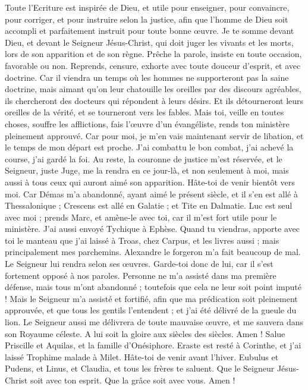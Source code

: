 \begin{multicols}{2}
Toute l'Ecriture est inspirée de Dieu, et utile pour enseigner, pour convaincre, pour corriger, et pour instruire selon la justice,
afin que l'homme de Dieu soit accompli et parfaitement instruit pour toute bonne œuvre.
\VerseOne{}Je te somme devant Dieu, et devant le Seigneur Jésus-Christ, qui doit juger les vivants et les morts, lors de son apparition et de son règne.
Prêche la parole, insiste en toute occasion, favorable ou non. Reprends, censure, exhorte avec toute douceur d'esprit, et avec doctrine.
Car il viendra un temps où les hommes ne supporteront pas la saine doctrine, mais aimant qu'on leur chatouille les oreilles par des discours agréables, ils chercheront des docteurs qui répondent à leurs désirs.
Et ils détourneront leurs oreilles de la vérité, et se tourneront vers les fables.
Mais toi, veille en toutes choses, souffre les afflictions, fais l'œuvre d'un évangéliste, rends ton ministère pleinement approuvé.
Car pour moi, je m'en vais maintenant servir de libation, et le temps de mon départ est proche.
J'ai combattu le bon combat, j'ai achevé la course, j'ai gardé la foi.
Au reste, la couronne de justice m'est réservée, et le Seigneur, juste Juge, me la rendra en ce jour-là, et non seulement à moi, mais aussi à tous ceux qui auront aimé son apparition.
Hâte-toi de venir bientôt vers moi.
Car Démas m'a abandonné, ayant aimé le présent siècle, et il s'en est allé à Thessalonique ; Crescens est allé en Galatie ; et Tite en Dalmatie.
Luc est seul avec moi ; prends Marc, et amène-le avec toi, car il m'est fort utile pour le ministère.
J'ai aussi envoyé Tychique à Ephèse.
Quand tu viendras, apporte avec toi le manteau que j'ai laissé à Troas, chez Carpus, et les livres aussi ; mais principalement mes parchemins.
Alexandre le forgeron m'a fait beaucoup de mal. Le Seigneur lui rendra selon ses œuvres.
Garde-toi donc de lui, car il s'est fortement opposé à nos paroles.
Personne ne m'a assisté dans ma première défense, mais tous m'ont abandonné ; toutefois que cela ne leur soit point imputé !
Mais le Seigneur m'a assisté et fortifié, afin que ma prédication soit pleinement approuvée, et que tous les gentils l’entendent ; et j'ai été délivré de la gueule du lion.
Le Seigneur aussi me délivrera de toute mauvaise œuvre, et me sauvera dans son Royaume céleste. A lui soit la gloire aux siècles des siècles. Amen !
Salue Priscille et Aquilas, et la famille d'Onésiphore.
Eraste est resté à Corinthe, et j'ai laissé Trophime malade à Milet.
Hâte-toi de venir avant l'hiver. Eubulus et Pudens, et Linus, et Claudia, et tous les frères te saluent.
Que le Seigneur Jésus-Christ soit avec ton esprit. Que la grâce soit avec vous. Amen !
\PPE{}
\end{multicols}
